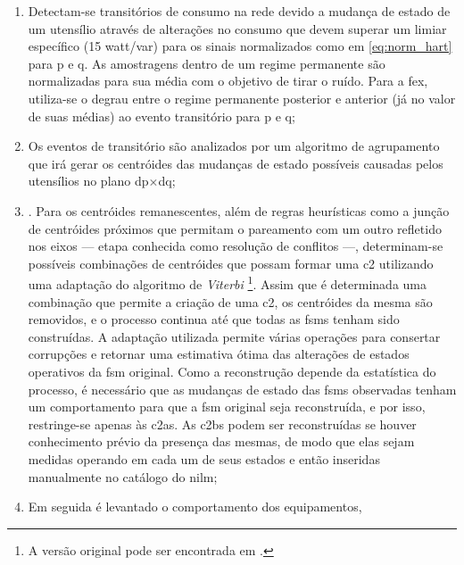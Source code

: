 \begin{enumerate}[label=\textbf{1.\arabic*},wide=\parindent]
\begin{enumerate}[label=\arabic*]
\item Detectam-se transitórios de consumo na rede devido a mudança de
estado de um utensílio através de alterações no consumo que devem
superar um limiar específico (15 \acs{watt}/\acs{var}) para os sinais
normalizados como em \ref{eq:norm_hart} para \acs{p} e \acs{q}.
As amostragens dentro de um regime permanente são normalizadas para
sua média com o objetivo de tirar o ruído. Para a \gls{fex}, utiliza-se o
degrau entre o regime permanente posterior e anterior (já no valor de
suas médias) ao evento transitório para \gls{p} e \gls{q};
\item Os eventos de transitório são analizados por um algoritmo de
agrupamento que irá gerar os centróides das mudanças de estado
possíveis causadas pelos utensílios no plano
\acs{dp}$\times$\acs{dq};
\item {}. Para os
centróides remanescentes, além de regras heurísticas como a junção de
centróides próximos que permitam o pareamento com um outro refletido
nos eixos --- etapa conhecida como resolução de conflitos ---,
determinam-se possíveis combinações de centróides que possam formar
uma \gls{c2} utilizando uma adaptação do algoritmo de \emph{Viterbi}
\cite{nilm_bouloutas_viterbi_ext_1991_11,
nilm_hart_fsm_viterbi_1993_12}\footnote{A versão original pode ser
encontrada em \cite{viterbi_alg}.}. Assim que é determinada uma combinação
que permite a criação de uma \gls{c2}, os centróides da mesma são
removidos, e o processo continua até que todas as \glspl{fsm} tenham
sido construídas. A adaptação utilizada
\cite{nilm_bouloutas_viterbi_ext_1991_11,
nilm_hart_fsm_viterbi_1993_12} permite várias operações para consertar
corrupções e retornar uma estimativa ótima das alterações de estados
operativos da \gls{fsm} original. Como a reconstrução depende da
estatística do processo, é necessário que as mudanças de estado das
\glspl{fsm} observadas tenham um comportamento para que a \gls{fsm}
original seja reconstruída, e por isso, restringe-se apenas às
\glspl{c2a}. As \glspl{c2b} podem ser reconstruídas se houver
conhecimento prévio da presença das mesmas, de modo que elas sejam
medidas operando em cada um de seus estados e então inseridas
manualmente no catálogo do \gls{nilm};
\item Em seguida é levantado o comportamento dos equipamentos,

\end{enumerate}
\end{enumerate}
